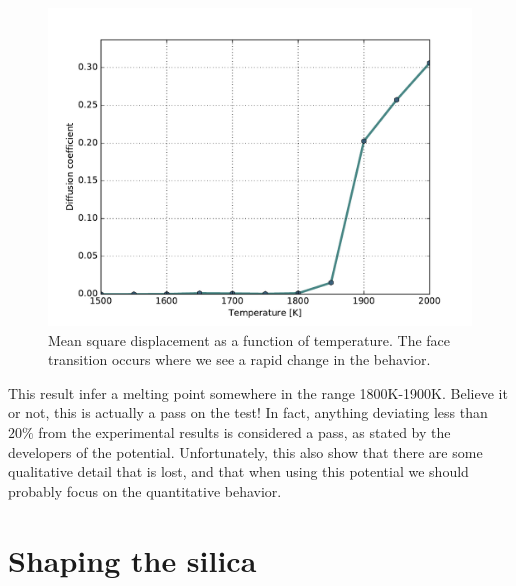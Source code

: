 \documentclass[twoside,english]{uiofysmaster}
\begin{document}

\begin{figure}[H]
\centering
\includegraphics[width=0.7\linewidth]{../SiO2/msd/figures/msd}
\caption{Mean square displacement as a function of temperature. The face transition occurs where we see a rapid change in the behavior.}
\label{fig:msd}
\end{figure}
This result infer a melting point somewhere in the range 1800K-1900K. 
Believe it or not, this is actually a pass on the test! 
In fact, anything deviating less than $20\%$ from the experimental results is considered a pass, as stated by the developers of the potential. 
Unfortunately, this also show that there are some qualitative detail that is lost, and that when using this potential we should probably focus on the quantitative behavior. 





\section{Shaping the silica}

\end{document}
